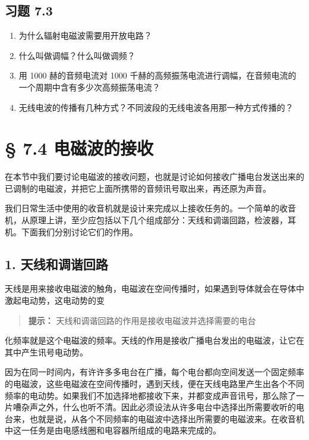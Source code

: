 \subsection{习题 7.3}\label{ux4e60ux9898-7.3}

\begin{enumerate}
\def\labelenumi{\arabic{enumi}.}
\item
  为什么辐射电磁波需要用开放电路？
\item
  什么叫做调幅？什么叫做调频？
\item
  用 1000 赫的音频电流对 1000
  千赫的高频振荡电流进行调幅，在音频电流的一个周期中含有多少次高频振荡电流？
\item
  无线电波的传播有几种方式？不同波段的无线电波各用那一种方式传播的？
\end{enumerate}

\section{§ 7.4 电磁波的接收}\label{ux7535ux78c1ux6ce2ux7684ux63a5ux6536}

在本节中我们要讨论电磁波的接收问题，也就是讨论如何接收广播电台发送出来的已调制的电磁波，并把它上面所携带的音频讯号取出来，再还原为声音。

我们日常生活中使用的收音机就是设计来完成以上接收任务的。一个简单的收音机，从原理上讲，至少应包括以下几个组成部分：天线和调谐回路，检波器，耳机。下面我们分别讨论它们的作用。

\subsection{1.
天线和调谐回路}\label{ux5929ux7ebfux548cux8c03ux8c10ux56deux8def}

天线是用来接收电磁波的触角，电磁波在空间传播时，如果遇到导体就会在导体中激起电动势，这电动势的变

\begin{quote}
\textbf{提示：} 天线和调谐回路的作用是接收电磁波并选择需要的电台
\end{quote}

化频率就是这个电磁波的频率。天线的作用是接收广播电台发出的电磁波，让它在其中产生讯号电动势。

因为在同一时间内，有许许多多电台在广播，每个电台都向空间发送一个固定频率的电磁波，这些电磁波在空间传播时，遇到天线，便在天线电路里产生出各个不同频率的电动势。如果我们不加选择地都接收下来，并都变成声音讯号，那么除了一片嘈杂声之外，什么也听不清。因此必须设法从许多电台中选择出所需要收听的电台来，也就是说，从各个不同频率的电磁波中选择出所需要的电磁波来。在收音机中这一任务是由电感线圈和电容器所组成的电路来完成的。

